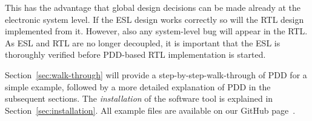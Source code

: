 This has the advantage that global design decisions can be made already at the electronic system level. %
If the ESL design works correctly so will the RTL design implemented from it. %
However, also any system-level bug will appear in the RTL. %
As ESL and RTL are no longer decoupled, it is important that the ESL is thoroughly verified before PDD-based RTL implementation is
started. %

Section~\ref{sec:walk-through} will provide a step-by-step-walk-through of PDD for a simple example, followed by a more detailed explanation of PDD in the subsequent sections. %
The \textit{installation} of the software tool \DeSCAM{} is explained in Section~\ref{sec:installation}. %
All example files are available on our GitHub page~\cite{web-DeSCAM}. %


